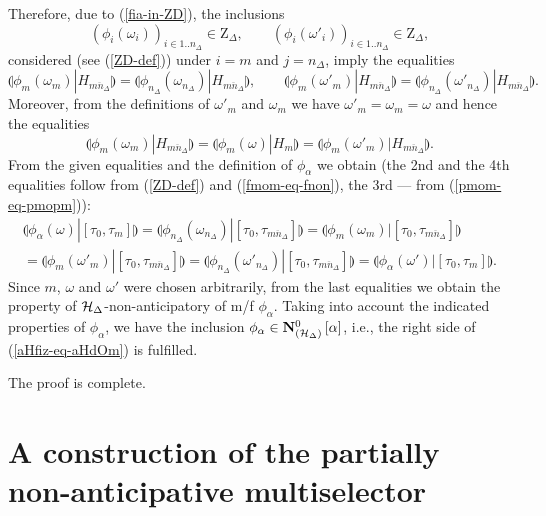 \documentclass[sn-mathphys,Numbered,pdflatex]{sn-jnl}%
\theoremstyle{thmstyleone}%
\theoremstyle{thmstyletwo}%
\theoremstyle{thmstylethree}%
\newcommand{\nint}[2]{{{#1}..{#2}}}%
\newcommand{\beq}{\begin{equation}}
\newcommand{\eeq}{\end{equation}}
\newcommand{\naZ}{\ensuremath{\mathrm{Z}}}%
\newcommand{\AnaNO}[2]{\mathbf{N}^0_{(#1)}\setbox0=\hbox{\text{$#2$}}\ifdim\wd0=0pt\else\left[{#2}\right]\fi}%
\newcommand{\sres}[2]{\llparenthesis#1|#2\rrparenthesis}%
\newcommand{\Ana}[2]{\ensuremath{\langle{#1}\rangle_{#2}}}%
\newcommand{\fref}[1]{{\rm(\ref{#1})}}   %
\begin{document}
Therefore, due to \fref{fia-in-ZD}, the inclusions
$$%
(\phi_i(\omega_i))_{i\in\nint1{n_\Delta}}\in\naZ_\Delta,\qquad (\phi_i(\omega'_i))_{i\in\nint1{n_\Delta}}\in\naZ_\Delta,
$$%
considered (see \fref{ZD-def}) under $i=m$ and $j=n_\Delta$, imply the equalities
\beq\label{fmom-eq-fnon}
\sres{\phi_{m}(\omega_{m})}{H_{\overline{m n_\Delta}}}=\sres{\phi_{n_\Delta}(\omega_{ n_\Delta})}{H_{\overline{m n_\Delta}}},\qquad
\sres{\phi_{m}(\omega'_{m})}{H_{\overline{m n_\Delta}}}=\sres{\phi_{n_\Delta}(\omega'_{n_\Delta})}{H_{\overline{m n_\Delta}}}.
\eeq
Moreover, from the definitions of $\omega'_{m}$ and $\omega_{m}$ we have $\omega'_{m}=\omega_{m}=\omega$ and hence the equalities
\beq\label{pmom-eq-pmopm}
\sres{\phi_{m}(\omega_{m})}{H_{\overline{m n_\Delta}}}=\sres{\phi_{m}(\omega)}{H_{m}}=\sres{\phi_{m}(\omega'_{m})}{H_{\overline{m n_\Delta}}}.
\eeq
From the given equalities and the definition of $\phi_\alpha$ we obtain (the 2nd and the 4th equalities follow from \fref{ZD-def} and \fref{fmom-eq-fnon}, the 3rd --- from \fref{pmom-eq-pmopm}):
\begin{multline*}
\sres{\phi_\alpha(\omega)}{[\tau_0,\tau_{m}]}=\sres{\phi_{n_\Delta}(\omega_{n_\Delta})}{[\tau_0, \tau_{\overline{m n_\Delta}}]}=\sres{\phi_{m}(\omega_{m})}{[\tau_0,\tau_{\overline{m n_\Delta}}]} \\
=\sres{\phi_{m}(\omega'_{m})}{[\tau_0,\tau_{\overline{m n_\Delta}}]}=\sres{\phi_{n_\Delta}( \omega'_{n_\Delta})}{[\tau_0,\tau_{\overline{m n_\Delta}}]}=\sres{\phi_\alpha(\omega')}{[\tau_0,\tau_{m}]}.
\end{multline*}
Since $m$, $\omega$ and $\omega'$ were chosen arbitrarily, from the last equalities we obtain the property of ${\cal H}_\Delta$-non-anticipatory of m/f $\phi_\alpha$.
Taking into account the indicated properties of $\phi_\alpha$, we have the inclusion $\phi_\alpha\in\AnaNO{{\cal H}_\Delta}{\alpha}$, i.e., the right side of \fref{aHfiz-eq-aHdOm} is fulfilled.

The proof is complete.






\section{A construction of the partially non-anticipative multiselector}
\label{Ana-oper}
\end{document}
